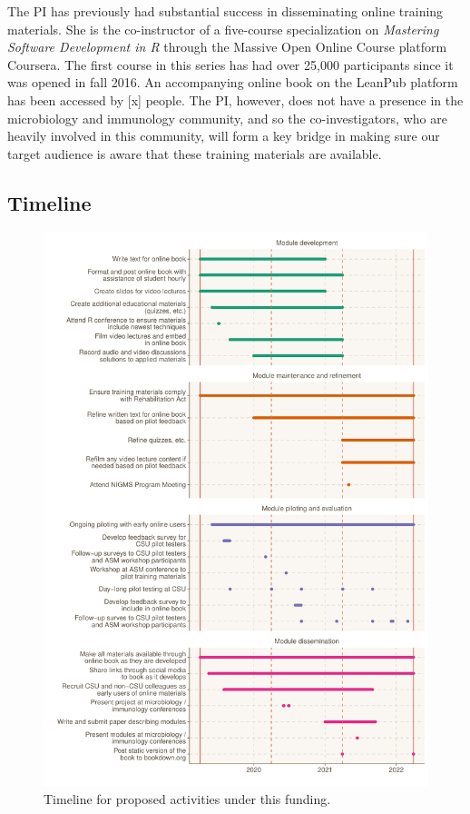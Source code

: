 \documentclass[pdftex,english,11pt,parskip=half]{scrartcl}
\begin{document}
The PI has previously had substantial success in disseminating online training materials. She is the co-instructor of a five-course specialization on \textit{Mastering Software Development in R} through the Massive Open Online Course platform Coursera. The first course in this series has had over 25,000 participants since it was opened in fall 2016. An accompanying online book on the LeanPub platform has been accessed by [x] people. The PI, however, does not have a presence in the microbiology and immunology community, and so the co-investigators, who are heavily involved in this community, will form a key bridge in making sure our target audience is aware that these training materials are available.

\subsection{Timeline}

\begin{figure}[ht]
    \includegraphics[width=\textwidth]{figures/timeline.pdf}
    \caption{Timeline for proposed activities under this funding.}
    \label{fig:timeline}
\end{figure}



\clearpage



\end{document}
